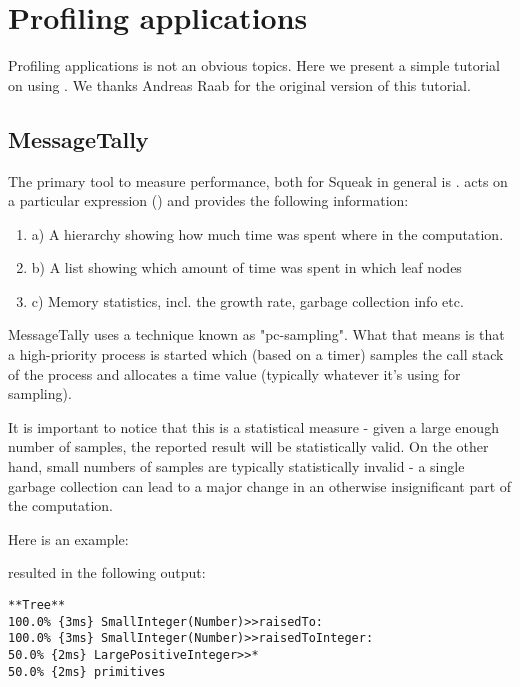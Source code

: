 \documentclass[a4paper,10pt,twoside]{book}
\begin{document}
	\renewcommand{\nnbb}[2]{} %
	\sloppy
\fi
\chapter{Profiling applications}

Profiling applications is not an obvious topics. Here we present a simple tutorial on using 
. We thanks Andreas Raab for the original version of this tutorial.



\section{MessageTally}

The primary tool to measure performance, both for Squeak in general  is .  acts on a particular expression () and provides
the following information:

\begin{enumerate}
\item a) A hierarchy showing how much time was spent where in the computation.
\item b) A list showing which amount of time was spent in which leaf nodes
\item c) Memory statistics, incl. the growth rate, garbage collection info etc.
\end{enumerate}

MessageTally uses a technique known as "pc-sampling". What that means is
that a high-priority process is started which (based on a timer) samples
the call stack of the process and allocates a time value (typically
whatever it's using for sampling).

It is important to notice that this is a statistical measure - given a
large enough number of samples, the reported result will be
statistically valid. On the other hand, small numbers of samples are
typically statistically invalid - a single garbage collection can lead
to a major change in an otherwise insignificant part of the computation.

Here is an example:


resulted in the following output:

\begin{verbatim}
**Tree**
100.0% {3ms} SmallInteger(Number)>>raisedTo:
100.0% {3ms} SmallInteger(Number)>>raisedToInteger:
50.0% {2ms} LargePositiveInteger>>*
50.0% {2ms} primitives
\end{verbatim}
\end{document}
